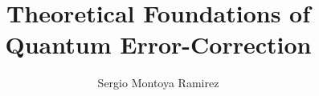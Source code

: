 \title{Theoretical Foundations of Quantum Error-Correction}
\newcommand{\customsize}{\fontsize{14.5}{15.6}\selectfont}
\author{Sergio Montoya Ramirez}
\coexaminer{}
\coexaminertwo{}
\draftdate{\today}

\uzhlogo
\maketitle
\cleardoublepage
